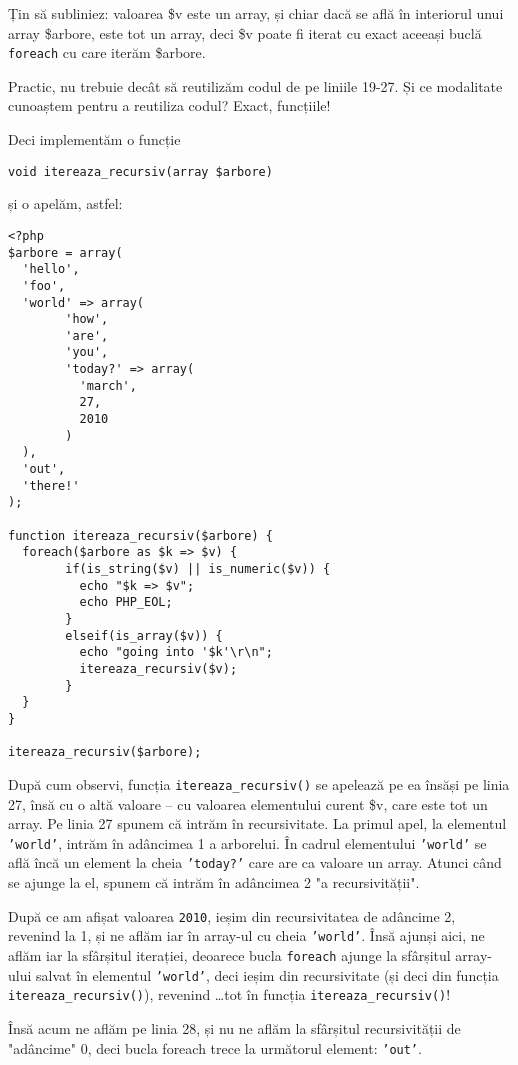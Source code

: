 Țin să subliniez: valoarea \$v este un array, și chiar
dacă se află în interiorul unui array \$arbore, este tot un
array, deci \$v poate fi iterat cu exact aceeași buclă
\texttt{foreach}
cu care iterăm \$arbore.

Practic, nu trebuie decât să reutilizăm codul de pe liniile
19-27. Și ce modalitate cunoaștem pentru a reutiliza codul?
Exact, funcțiile!

Deci implementăm o funcție
\begin{verbatim}
void itereaza_recursiv(array $arbore)
\end{verbatim}
și o apelăm, astfel:
\begin{lstlisting}
<?php
$arbore = array(
  'hello',
  'foo',
  'world' => array(
        'how',
        'are',
        'you',
        'today?' => array(
          'march',
          27,
          2010
        )
  ),
  'out',
  'there!'
);

function itereaza_recursiv($arbore) {
  foreach($arbore as $k => $v) {
        if(is_string($v) || is_numeric($v)) {
          echo "$k => $v";
          echo PHP_EOL;
        }
        elseif(is_array($v)) {
          echo "going into '$k'\r\n";
          itereaza_recursiv($v);
        }
  }
}

itereaza_recursiv($arbore);
\end{lstlisting}
După cum observi, funcția \texttt{itereaza\_recursiv()} se apelează
pe ea însăși pe linia 27, însă cu o altă valoare -- cu
valoarea elementului curent \$v, care este tot un array.
Pe linia 27 spunem că intrăm în recursivitate. La primul apel,
la elementul \texttt{'world'}, intrăm în adâncimea 1
a arborelui. În cadrul elementului \texttt{'world'}
se află încă un element la cheia \texttt{'today?'}
care are ca valoare un array. Atunci când se ajunge la el,
spunem că intrăm în adâncimea 2 "a recursivității".

După ce am afișat valoarea \texttt{2010}, ieșim din recursivitatea
de adâncime 2, revenind la 1, și ne aflăm iar în array-ul cu
cheia \texttt{'world'}. Însă ajunși aici, ne aflăm iar
la sfârșitul iterației, deoarece bucla \texttt{foreach}
ajunge la sfârșitul array-ului salvat în elementul \texttt{'world'},
deci ieșim din recursivitate (și deci din funcția \texttt{itereaza\_recursiv()}),
revenind \ldots tot în funcția \texttt{itereaza\_recursiv()}!

Însă acum ne aflăm pe linia 28, și nu ne aflăm la sfârșitul recursivității
de "adâncime" 0, deci bucla foreach trece la următorul element: \texttt{'out'}.



